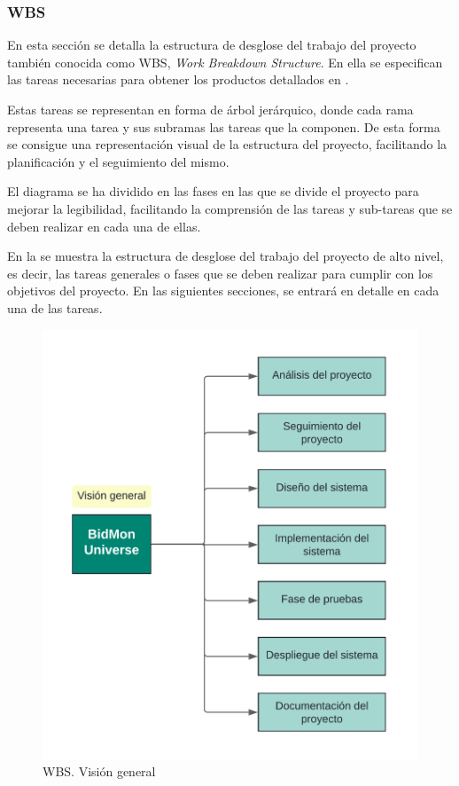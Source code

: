 \subsubsection{WBS} \label{sec:5-WBS}
\hypertarget{sec:5-WBS}{}
En esta sección se detalla la estructura de desglose del trabajo del proyecto también conocida como WBS, \textit{Work Breakdown Structure}. 
En ella se especifican las tareas necesarias para obtener los productos detallados en .

Estas tareas se representan en forma de árbol jerárquico, donde cada rama representa una tarea y sus subramas las tareas que la componen. 
De esta forma se consigue una representación visual de la estructura del proyecto, facilitando la planificación y el seguimiento del mismo.

El diagrama se ha dividido en las fases en las que se divide el proyecto para mejorar la legibilidad, facilitando la comprensión de las tareas y sub-tareas que se deben realizar en cada una de ellas.

En la  se muestra la estructura de desglose del trabajo del proyecto de alto nivel, es decir, 
las tareas generales o fases que se deben realizar para cumplir con los objetivos del proyecto.
En las siguientes secciones, se entrará en detalle en cada una de las tareas.
\begin{figure}[H]
    \hypertarget{fig:5_WBS-Vision-General}{}
    \centering
    \includegraphics[width=0.5\linewidth]{figures/5-WBS/5_WBS-Vision-General.png}
    \caption{WBS. Visión general}
    \label{fig:5_WBS-Vision-General}
\end{figure}

